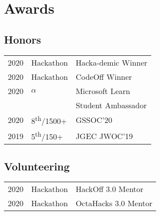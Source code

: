 \documentclass[]{deedy-resume-reversed}
\begin{document}
\begin{minipage}[t]{0.35\textwidth}


\section{Awards}
\subsection{Honors}
\begin{tabular}{rll}
2020        & Hackathon & Hacka-demic Winner\\
2020        & Hackathon & CodeOff Winner\\
2020        & $\alpha$  & Microsoft Learn \\ 
& & Student Ambassador\\
2020        & 8\textsuperscript{th}/1500+ & GSSOC'20\\
2019        & 5\textsuperscript{th}/150+ & JGEC JWOC'19\\
\end{tabular}
\sectionsep
\subsection{Volunteering }
\begin{tabular}{rll}
2020        & Hackathon & HackOff 3.0 Mentor\\
2020        & Hackathon & OctaHacks 3.0 Mentor\\
\end{tabular}
\sectionsep
\sectionsep




\end{minipage}
\end{document}
